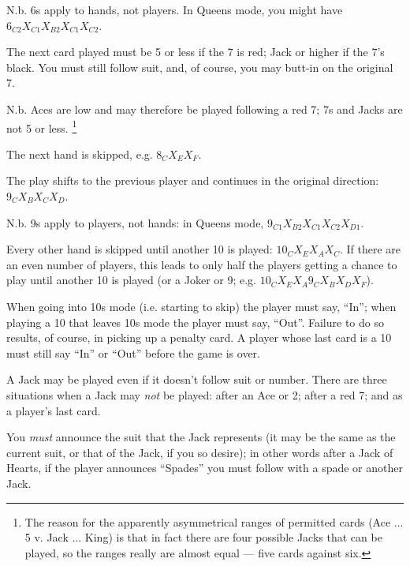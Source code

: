 \documentclass[12pt]{article}
\begin{document}
\begin{description}
    N.b. 6s apply to hands, not players.  In Queens mode, you might have $6_{C2} X_{C1} X_{B2} X_{C1} X_{C2}$.

  \item[\card{7}] The next card played must be 5 or less if the 7 is red; Jack or higher if the 7's black. You
    must still follow suit, and, of course, you may butt-in on the original 7.
    
    N.b. Aces are low and may therefore be played following a red 7; 7s and Jacks are not 5 or less.%
    \footnote{The reason for the apparently asymmetrical ranges of permitted cards (Ace ... 5 v. Jack ... King)
    is that in fact there are four possible Jacks that can be played, so the ranges really are almost
    equal --- five cards against six.}

  \item[\card{8}]
    The next hand is skipped, e.g. $8_C X_E X_F$.

  \item[\card{9}]
    The play shifts to the previous player and continues in the original direction: $9_C X_B X_C X_D$.

    N.b. 9s apply to players, not hands: in Queens mode, $9_{C1} X_{B2} X_{C1} X_{C2} X_{D1}$.

  \item[\card{10}]
    Every other hand is skipped until another 10 is played: $10_C X_E X_A X_C$.  If there are an even number of
    players, this leads to only half the players getting a chance to play until another
    10 is played (or a Joker or 9; e.g.  $10_C X_E X_A 9_C X_B X_D X_F$).

    When going into 10s mode (i.e. starting to skip) the player must say, ``In''; when playing a
    10 that leaves 10s mode the player must say, ``Out''.  Failure to do so results, of course,
    in picking up a penalty card.  A player whose last card is a 10 must still say ``In'' or ``Out''
    before the game is over.

  \item[\card{Jack}]
    A Jack may be played even if it doesn't follow suit or number.  There are three situations
    when a Jack may \emph{not} be played:  after an Ace or 2; after a red 7; and as a player's last card.

    You \emph{must} announce the suit that the Jack represents (it may be the same as the
    current suit, or that of the Jack, if you so desire);  in other words after a Jack of
    Hearts, if the player announces ``Spades'' you must follow with a spade or another Jack.


\end{description}
\end{document}
